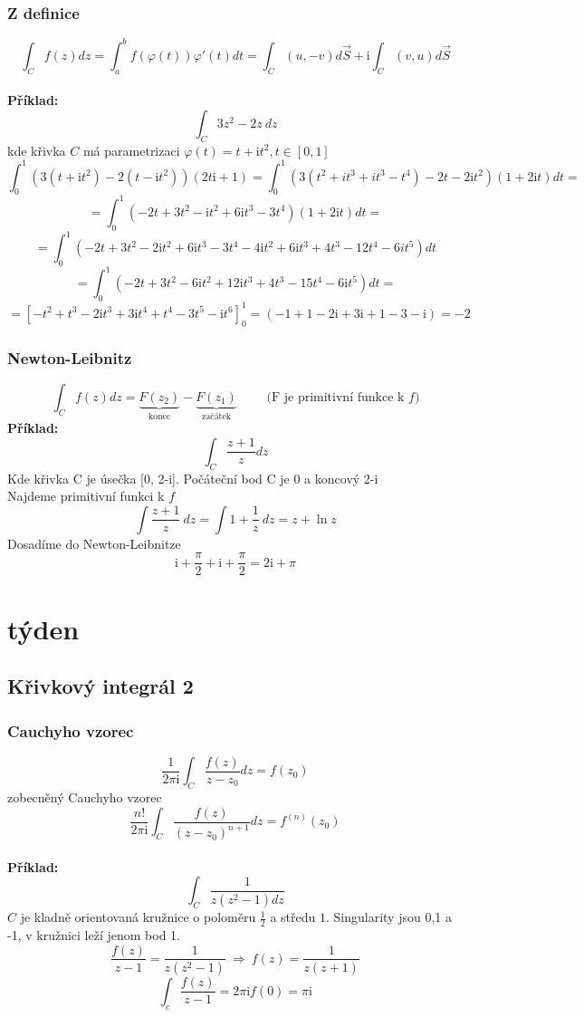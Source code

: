 \documentclass{article}
\newcommand{\mi}{\mathrm{i}}
\begin{document}
        \subsubsection{Z definice}
            \[\int_{C}f(z)dz=\int_{a}^{b}f(\varphi(t))\varphi'(t)dt=
            \int_C(u,-v)d\vec{S}+\mi\int_C(v,u)d\vec{S}\]
        \\
        {\bf Příklad:}
        \[\int_C3z^2-2z\:dz\]
        kde křivka $C$ má parametrizaci $\varphi(t)=t+\mi t^2, t\in[0,1]$
        \[\int_0^1(3(t+\mi t^2)-2(t-\mi t^2))(2t\mi+1)=
        \int_0^1(3(t^2+it^3+it^3-t^4)-2t-2\mi t^2)(1+2\mi t)dt=\]
        \[=\int_0^1(-2t+3t^2-\mi t^2+6\mi t^3-3t^4)(1+2\mi t)dt=\]
        \[=\int_0^1(-2t+3t^2-2\mi t^2+6\mi t^3-3t^4-4\mi t^2+6\mi t^3+4t^3-12t^4-6it^5)dt\]
        \[=\int_0^1(-2t+3t^2-6\mi t^2+12\mi t^3+4t^3-15t^4-6\mi t^5)dt=\]
        \[=\left[-t^2+t^3-2\mi t^3+3\mi t^4+t^4-3t^5-\mi t^6\right]_0^1=
        (-1+1-2\mi+3\mi+1-3-\mi)=-2\]
        \subsubsection{Newton-Leibnitz}
            \[\int_Cf(z)dz=\underbrace{F(z_2)}_{\mbox{konec}}
            -\underbrace{F(z_1)}_{\mbox{začátek}}\qquad\mbox{ (F je primitivní funkce k $f$)}\]
        {\bf Příklad:}
            \[\int_C\frac{z+1}{z}dz\]
            Kde křivka C je úsečka [0, 2-i]. Počáteční bod C je 0 a koncový 2-i
            \\
            Najdeme primitivní funkci k $f$
            \[\int\frac{z+1}{z}\:dz=\int 1+\frac{1}{z}\:dz=z+\ln z\]
            Dosadíme do Newton-Leibnitze
            \[\mi+\frac{\pi}{2}+\mi+\frac{\pi}{2}=2\mi +\pi\]
    \section{týden}%
        \subsection{Křivkový integrál 2}
        \subsubsection{Cauchyho vzorec}
            \[\frac{1}{2\pi\mi}\int_C\frac{f(z)}{z-z_0}dz=f(z_0)\]
        zobecněný Cauchyho vzorec
        \[\frac{n!}{2\pi\mi}\int_C\frac{f(z)}{(z-z_0)^{n+1}}dz=f^{(n)}(z_0)\]
        \\
        {\bf Příklad:}
        \[\label{eq1}\int_C\frac{1}{z(z^2-1)dz}\]
        $C$ je kladně orientovaná kružnice o poloměru $\frac{1}{2}$ a středu $1$.
        Singularity jsou 0,1 a -1, v kružnici leží jenom bod 1.
        \[\frac{f(z)}{z-1}=\frac{1}{z(z^2-1)}\:\Rightarrow\:f(z)=\frac{1}{z(z+1)}\]
        \[\int_c\frac{f(z)}{z-1}=2\pi\mi f(0)=\pi\mi\]
\end{document}
